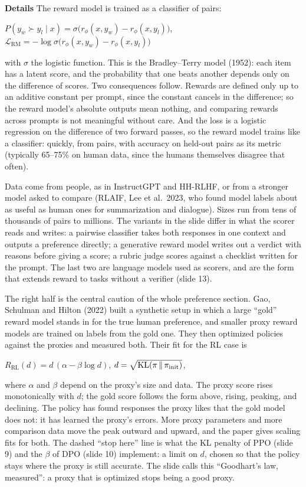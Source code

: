 \documentclass[11pt,letterpaper]{article}
\newcommand{\para}[1]{\medskip\noindent\textbf{#1}\quad}
\newenvironment{formulas}{\begin{tcolorbox}[formulabox]}{\end{tcolorbox}}
\begin{document}
\para{Details} The reward model is trained as a classifier of pairs:
\begin{formulas}
$P(y_w\succ y_l\mid x)=\sigma\big(r_\phi(x,y_w)-r_\phi(x,y_l)\big)$, \qquad
$\mathcal{L}_{\text{RM}}=-\log\sigma\big(r_\phi(x,y_w)-r_\phi(x,y_l)\big)$
\end{formulas}
with $\sigma$ the logistic function. This is the Bradley--Terry model (1952): each item has a latent score, and the probability that one beats another depends only on the difference of scores. Two consequences follow. Rewards are defined only up to an additive constant per prompt, since the constant cancels in the difference; so the reward model's absolute outputs mean nothing, and comparing rewards across prompts is not meaningful without care. And the loss is a logistic regression on the difference of two forward passes, so the reward model trains like a classifier: quickly, from pairs, with accuracy on held-out pairs as its metric (typically 65--75\% on human data, since the humans themselves disagree that often).

Data come from people, as in InstructGPT and HH-RLHF, or from a stronger model asked to compare (RLAIF, Lee et al.\ 2023, who found model labels about as useful as human ones for summarization and dialogue). Sizes run from tens of thousands of pairs to millions. The variants in the slide differ in what the scorer reads and writes: a pairwise classifier takes both responses in one context and outputs a preference directly; a generative reward model writes out a verdict with reasons before giving a score; a rubric judge scores against a checklist written for the prompt. The last two are language models used as scorers, and are the form that extends reward to tasks without a verifier (slide 13).

The right half is the central caution of the whole preference section. Gao, Schulman and Hilton (2022) built a synthetic setup in which a large ``gold'' reward model stands in for the true human preference, and smaller proxy reward models are trained on labels from the gold one. They then optimized policies against the proxies and measured both. Their fit for the RL case is
\begin{formulas}
$R_{\text{RL}}(d)=d\,(\alpha-\beta\log d)$, \qquad $d=\sqrt{\mathrm{KL}(\pi\,\|\,\pi_{\text{init}})}$,
\end{formulas}
where $\alpha$ and $\beta$ depend on the proxy's size and data. The proxy score rises monotonically with $d$; the gold score follows the form above, rising, peaking, and declining. The policy has found responses the proxy likes that the gold model does not: it has learned the proxy's errors. More proxy parameters and more comparison data move the peak outward and upward, and the paper gives scaling fits for both. The dashed ``stop here'' line is what the KL penalty of PPO (slide 9) and the $\beta$ of DPO (slide 10) implement: a limit on $d$, chosen so that the policy stays where the proxy is still accurate. The slide calls this ``Goodhart's law, measured'': a proxy that is optimized stops being a good proxy.
\end{document}
